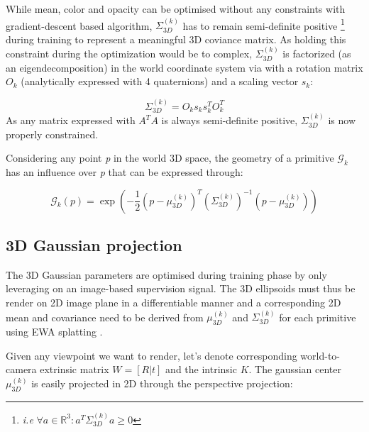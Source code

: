 While mean, color and opacity can be optimised without any constraints with gradient-descent based algorithm, $\Sigma^{(k)}_{3D}$ has to remain semi-definite positive \footnote{\textit{i.e} $ \forall a \in \mathbb{R}^{3}: a^{T}\Sigma^{(k)}_{3D}a \geq 0$} during training to represent a meaningful 3D coviance matrix. As holding this constraint during the optimization would be to complex, $\Sigma^{(k)}_{3D}$ is factorized (as an eigendecomposition) in the world coordinate system via with a rotation matrix $O_{k}$ (analytically expressed with 4 quaternions) and a scaling vector $s_{k}$: 

\begin{equation}
    \Sigma^{(k)}_{3D} = O_{k}s_{k}s_{k}^{T}O_{k}^{T}
\end{equation}
As any matrix expressed with $A^{T}A$ is always semi-definite positive, $\Sigma^{(k)}_{3D}$ is now properly constrained. 

Considering any point \textit{p} in the world 3D space, the geometry of a primitive $\mathcal{G}_{k}$ has an influence over \textit{p} that can be expressed through: 

\begin{equation}
  \mathcal{G}_{k}(p) = \exp \left(-\frac{1}{2}(p-\mu^{(k)}_{3D})^{T}(\Sigma^{(k)}_{3D})^{-1}(p-\mu^{(k)}_{3D})\right)
\end{equation}

\subsection{3D Gaussian projection} The 3D Gaussian parameters are optimised during training phase by only leveraging on an image-based supervision signal. The 3D ellipsoids must thus be render on 2D image plane in a differentiable manner and a corresponding 2D mean and covariance need to be derived from $\mu^{(k)}_{3D}$ and $\Sigma^{(k)}_{3D}$ for each primitive using EWA splatting \citep{zwicker2001ewa}. 

Given any viewpoint we want to render, let's denote corresponding world-to-camera extrinsic matrix $W=[R|t]$ and the intrinsic $K$. The gaussian center $\mu^{(k)}_{3D}$ is easily projected in 2D through the perspective projection: 

